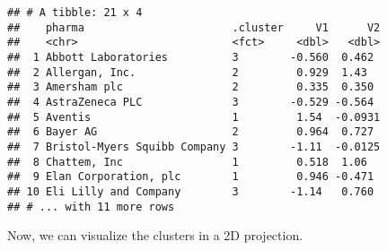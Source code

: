 \documentclass[]{article}
\newenvironment{Shaded}{\begin{snugshade}}{\end{snugshade}}
\newcommand{\KeywordTok}[1]{\textcolor[rgb]{0.13,0.29,0.53}{\textbf{#1}}}
\newcommand{\DataTypeTok}[1]{\textcolor[rgb]{0.13,0.29,0.53}{#1}}
\newcommand{\StringTok}[1]{\textcolor[rgb]{0.31,0.60,0.02}{#1}}
\newcommand{\CommentTok}[1]{\textcolor[rgb]{0.56,0.35,0.01}{\textit{#1}}}
\newcommand{\OperatorTok}[1]{\textcolor[rgb]{0.81,0.36,0.00}{\textbf{#1}}}
\newcommand{\NormalTok}[1]{#1}
\begin{document}
\begin{Shaded}
\end{Shaded}

\begin{verbatim}
## # A tibble: 21 x 4
##    pharma                       .cluster     V1      V2
##    <chr>                        <fct>     <dbl>   <dbl>
##  1 Abbott Laboratories          3        -0.560  0.462 
##  2 Allergan, Inc.               2         0.929  1.43  
##  3 Amersham plc                 2         0.335  0.350 
##  4 AstraZeneca PLC              3        -0.529 -0.564 
##  5 Aventis                      1         1.54  -0.0931
##  6 Bayer AG                     2         0.964  0.727 
##  7 Bristol-Myers Squibb Company 3        -1.11  -0.0125
##  8 Chattem, Inc                 1         0.518  1.06  
##  9 Elan Corporation, plc        1         0.946 -0.471 
## 10 Eli Lilly and Company        3        -1.14   0.760 
## # ... with 11 more rows
\end{verbatim}

Now, we can visualize the clusters in a 2D projection.
\end{document}
